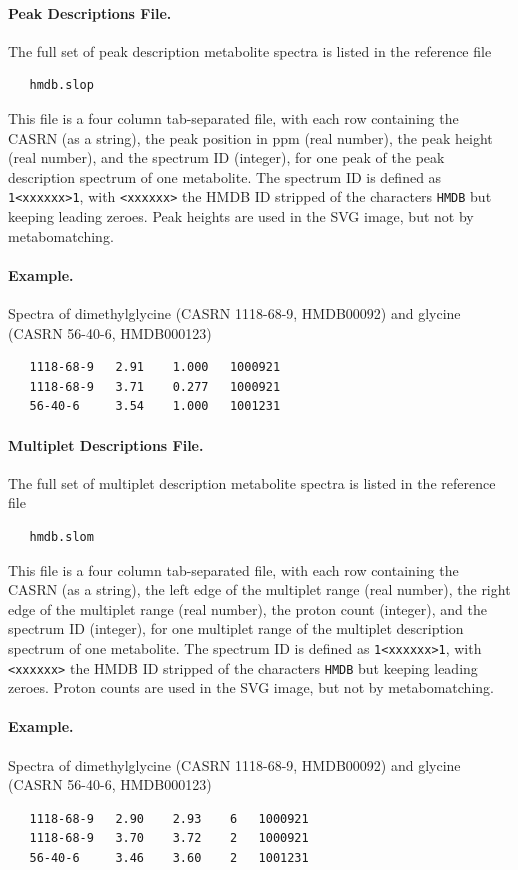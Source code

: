 \documentclass[a4paper,11pt]{article}
\begin{document}
\paragraph{Peak Descriptions File.} The full set of peak description metabolite spectra is listed in the reference file
\begin{verbatim}
   hmdb.slop
\end{verbatim}
This file is a four column tab-separated file, with each row containing the CASRN (as a string), the peak position in ppm (real number), the peak height (real number), and the spectrum ID (integer), for one peak of the peak description spectrum of one metabolite. The spectrum ID is defined as \verb|1<xxxxxx>1|, with \verb|<xxxxxx>| the HMDB ID stripped of the characters \verb|HMDB| but keeping leading zeroes. Peak heights are used in the SVG image, but not by metabomatching.
\paragraph{Example.} Spectra of dimethylglycine (CASRN 1118-68-9, HMDB00092) and glycine (CASRN 56-40-6, HMDB000123)
\begin{verbatim}
   1118-68-9   2.91    1.000   1000921
   1118-68-9   3.71    0.277   1000921
   56-40-6     3.54    1.000   1001231
\end{verbatim}

\paragraph{Multiplet Descriptions File.} The full set of multiplet description metabolite spectra is listed in the reference file
\begin{verbatim}
   hmdb.slom
\end{verbatim}
This file is a four column tab-separated file, with each row containing the CASRN (as a string), the left edge of the multiplet range (real number),  the right edge of the multiplet range (real number), the proton count (integer), and the spectrum ID (integer), for one multiplet range of the multiplet description spectrum of one metabolite. The spectrum ID is defined as \verb|1<xxxxxx>1|, with \verb|<xxxxxx>| the HMDB ID stripped of the characters \verb|HMDB| but keeping leading zeroes. Proton counts are used in the SVG image, but not by metabomatching.
\paragraph{Example.} Spectra of dimethylglycine (CASRN 1118-68-9, HMDB00092) and glycine (CASRN 56-40-6, HMDB000123)
\begin{verbatim}
   1118-68-9   2.90    2.93    6   1000921
   1118-68-9   3.70    3.72    2   1000921
   56-40-6     3.46    3.60    2   1001231
\end{verbatim}
\end{document}
